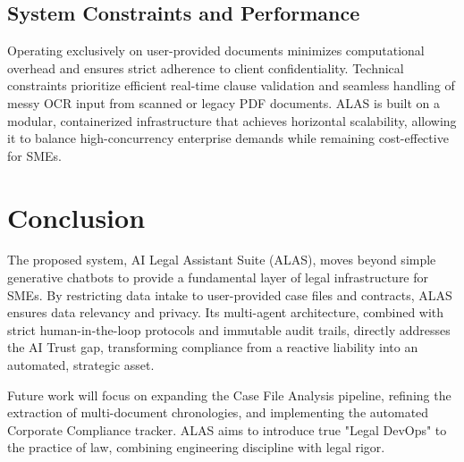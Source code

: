 \subsection{System Constraints and Performance}
Operating exclusively on user-provided documents minimizes computational overhead and ensures strict adherence to client confidentiality. Technical constraints prioritize efficient real-time clause validation and seamless handling of messy OCR input from scanned or legacy PDF documents. ALAS is built on a modular, containerized infrastructure that achieves horizontal scalability, allowing it to balance high-concurrency enterprise demands while remaining cost-effective for SMEs.

\section{Conclusion}
The proposed system, AI Legal Assistant Suite (ALAS), moves beyond simple generative chatbots to provide a fundamental layer of legal infrastructure for SMEs. By restricting data intake to user-provided case files and contracts, ALAS ensures data relevancy and privacy. Its multi-agent architecture, combined with strict human-in-the-loop protocols and immutable audit trails, directly addresses the AI Trust gap, transforming compliance from a reactive liability into an automated, strategic asset.

Future work will focus on expanding the Case File Analysis pipeline, refining the extraction of multi-document chronologies, and implementing the automated Corporate Compliance tracker. ALAS aims to introduce true "Legal DevOps" to the practice of law, combining engineering discipline with legal rigor.

